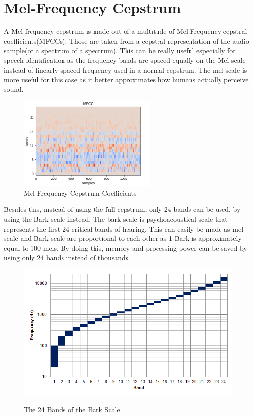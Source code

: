 \section{Mel-Frequency Cepstrum}
A Mel-frequency cepstrum is made out of a multitude of Mel-Frequency cepstral coefficients(MFCCs). 
Those are taken from a cepstral representation of the audio sample(or a spectrum of a spectrum).
This can be really useful especially for speech identification as the frequency bands are spaced 
equally on the Mel scale instead of linearly spaced frequency used in a normal cepstrum. 
The mel scale is more useful for this case as it better approximates how humans actually perceive sound.
\cite{MFCC}

\begin{figure}[htp]
	\centering
	\includegraphics[width = 0.6\textwidth]{Illustrations/mfcc.png}
	\caption{Mel-Frequency Cepstrum Coefficients}
	\label{fig:mfcc}
\end{figure}

\newpage
Besides this, instead of using the full cepstrum, only 24 bands can be used, 
by using the Bark scale instead.
The bark scale is psychoacoustical scale that represents the first 24 critical bands of hearing.
This can easily be made as mel scale and Bark scale are proportional to each other as 1 Bark 
is approximately equal to 100 mels.
By doing this, memory and processing power can be saved by using only 24 bands instead of thousands.
\cite{BARKSCALE}
\begin{figure}[htp]
	\centering
	\includegraphics[width=1\textwidth]{Illustrations/Bark_scale.png}
	\caption{The 24 Bands of the Bark Scale}\cite{BARKSCALEPHTOT}
	\label{fig:BarkScale}
\end{figure}

